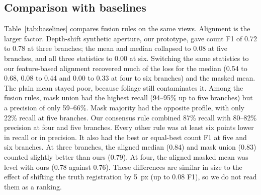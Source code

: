 \subsection{Comparison with baselines}
Table~\ref{tab:baselines} compares fusion rules on the same views. Alignment is the larger factor. Depth-shift synthetic aperture, our prototype, gave count F1 of 0.72 to 0.78 at three branches; the mean and median collapsed to 0.08 at five branches, and all three statistics to 0.00 at six. Switching the same statistics to our feature-based alignment recovered much of the loss for the median (0.54 to 0.68, 0.08 to 0.44 and 0.00 to 0.33 at four to six branches) and the masked mean. The plain mean stayed poor, because foliage still contaminates it. Among the fusion rules, mask union had the highest recall (94--95\% up to five branches) but a precision of only 59--66\%. Mask majority had the opposite profile, with only 22\% recall at five branches. Our consensus rule combined 87\% recall with 80--82\% precision at four and five branches. Every other rule was at least six points lower in recall or in precision. It also had the best or equal-best count F1 at five and six branches. At three branches, the aligned median (0.84) and mask union (0.83) counted slightly better than ours (0.79). At four, the aligned masked mean was level with ours (0.78 against 0.76). These differences are similar in size to the effect of shifting the truth registration by 5~px (up to 0.08 F1), so we do not read them as a ranking.

